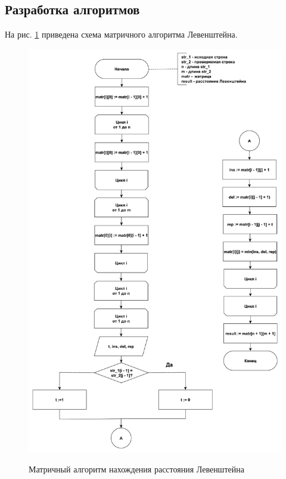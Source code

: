 \documentclass[a4paper,12pt]{article}
\begin{document}
    
        
        
    \subsection{Разработка алгоритмов}
    
        На рис. \ref{fig:schema_lev_matr} приведена схема матричного алгоритма 					Левенштейна.
        
        \begin{figure}[h!]
        	\begin{center}
        		{\includegraphics[scale = 0.37]{schema02.pdf}}
        		\caption{Матричный алгоритм нахождения расстояния Левенштейна}
        		\label{fig:schema_lev_matr}
        	\end{center}
        \end{figure}
        
\end{document}
